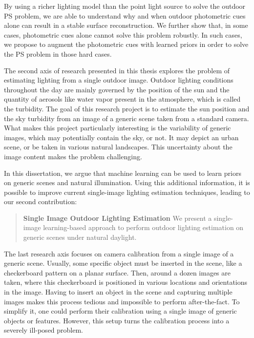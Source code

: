 By using a richer lighting model than the point light source to solve the outdoor PS problem, we are able to understand why and when outdoor photometric cues alone can result in a stable surface reconstruction. We further show that, in some cases, photometric cues alone cannot solve this problem robustly. In such cases, we propose to augment the photometric cues with learned priors in order to solve the PS problem in those hard cases. 

The second axis of research presented in this thesis explores the problem of estimating lighting from a single outdoor image. Outdoor lighting conditions throughout the day are mainly governed by the position of the sun and the quantity of aerosols like water vapor present in the atmosphere, which is called the turbidity. The goal of this research project is to estimate the sun position and the sky turbidity from an image of a generic scene taken from a standard camera. What makes this project particularly interesting is the variability of generic images, which may potentially contain the sky, or not. It may depict an urban scene, or be taken in various natural landscapes. This uncertainty about the image content makes the problem challenging. 

In this dissertation, we argue that machine learning can be used to learn priors on generic scenes and natural illumination. Using this additional information, it is possible to improve current single-image lighting estimation techniques, leading to our second contribution: 

\begin{quotation}
\textbf{Single Image Outdoor Lighting Estimation} We present a single-image learning-based approach to perform outdoor lighting estimation on generic scenes under natural daylight. 
\end{quotation}





The last research axis focuses on camera calibration from a single image of a generic scene. %
Usually, some specific object must be inserted in the scene, like a checkerboard pattern on a planar surface. Then, around a dozen images are taken, where this checkerboard is positioned in various locations and orientations in the image. Having to insert an object in the scene and capturing multiple images makes this process tedious and impossible to perform after-the-fact. To simplify it, one could perform their calibration using a single image of generic objects or features. However, this setup turns the calibration process into a severely ill-posed problem. 

